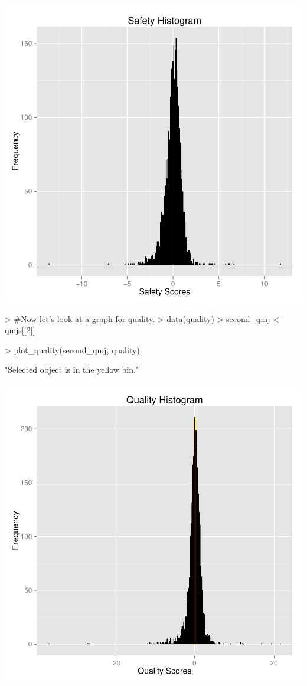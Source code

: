 \documentclass[12pt]{article}
\begin{document}
\includegraphics{paper-007}

\begin{Schunk}
\begin{Sinput}
> #Now let's look at a graph for quality.
> data(quality)
> second_qmj <- qmjs[[2]]
\end{Sinput}
\end{Schunk}
\begin{Schunk}
\begin{Sinput}
> plot_quality(second_qmj, quality)
\end{Sinput}
\begin{Soutput}
[1] "Selected object is in the yellow bin."
\end{Soutput}
\end{Schunk}
\includegraphics{paper-009}
\end{document}
